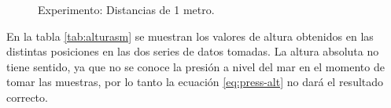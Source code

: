 \documentclass[spanish,12pt,a4paper,titlepage]{report}
\begin{document}
\vspace{-25pt}
\begin{figure}[H]
\hspace{-70pt}
\vspace{-10pt}
  \caption{Experimento: Distancias de 1 metro.}
\label{fig:1m}
\end{figure}



En la tabla \ref{tab:alturasm} se muestran los valores de altura obtenidos en las distintas posiciones en las dos series de datos tomadas. La altura absoluta no tiene sentido, ya que no se conoce la presión a nivel del mar en el momento de tomar las muestras, por lo tanto la ecuación \ref{eq:press-alt} no dará el resultado correcto.
\end{document}
